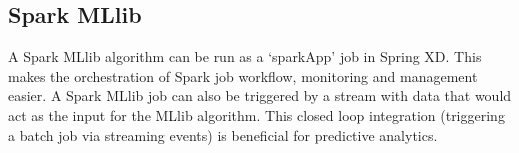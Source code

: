 \subsection{Spark MLlib}
A Spark MLlib algorithm can be run as a `sparkApp' job in Spring XD. This makes the
orchestration of Spark job workflow, monitoring and management easier.
A Spark MLlib job can also be triggered by a stream with data that
would act as the input for the MLlib algorithm. This closed loop
integration (triggering a batch job via streaming events) is
beneficial for predictive analytics.
